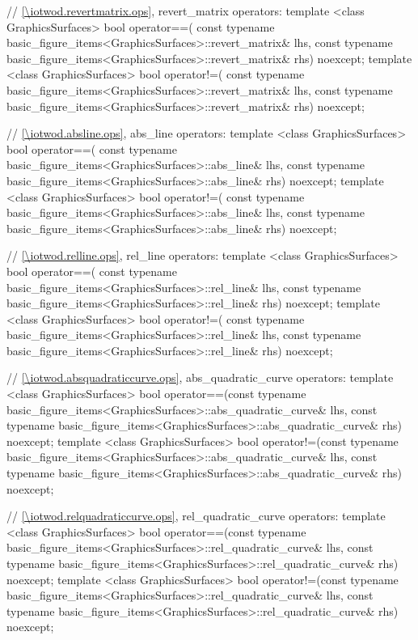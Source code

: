 \begin{codeblock}
{  // \ref{\iotwod.revertmatrix.ops}, revert_matrix operators:
  template <class GraphicsSurfaces>
  bool operator==(
    const typename basic_figure_items<GraphicsSurfaces>::revert_matrix& lhs,
    const typename basic_figure_items<GraphicsSurfaces>::revert_matrix& rhs) 
    noexcept;
  template <class GraphicsSurfaces>
  bool operator!=(
    const typename basic_figure_items<GraphicsSurfaces>::revert_matrix& lhs,
    const typename basic_figure_items<GraphicsSurfaces>::revert_matrix& rhs) 
    noexcept;

  // \ref{\iotwod.absline.ops}, abs_line operators:
  template <class GraphicsSurfaces>
  bool operator==(
    const typename basic_figure_items<GraphicsSurfaces>::abs_line& lhs,
    const typename basic_figure_items<GraphicsSurfaces>::abs_line& rhs) 
    noexcept;
  template <class GraphicsSurfaces>
  bool operator!=(
    const typename basic_figure_items<GraphicsSurfaces>::abs_line& lhs,
    const typename basic_figure_items<GraphicsSurfaces>::abs_line& rhs) 
    noexcept;

  // \ref{\iotwod.relline.ops}, rel_line operators:
  template <class GraphicsSurfaces>
  bool operator==(
    const typename basic_figure_items<GraphicsSurfaces>::rel_line& lhs,
    const typename basic_figure_items<GraphicsSurfaces>::rel_line& rhs) 
    noexcept;
  template <class GraphicsSurfaces>
  bool operator!=(
    const typename basic_figure_items<GraphicsSurfaces>::rel_line& lhs,
    const typename basic_figure_items<GraphicsSurfaces>::rel_line& rhs) 
    noexcept;

  // \ref{\iotwod.absquadraticcurve.ops}, abs_quadratic_curve operators:
  template <class GraphicsSurfaces>
  bool operator==(const typename
    basic_figure_items<GraphicsSurfaces>::abs_quadratic_curve& lhs,
    const typename basic_figure_items<GraphicsSurfaces>::abs_quadratic_curve& 
    rhs) noexcept;
  template <class GraphicsSurfaces>
  bool operator!=(const typename 
    basic_figure_items<GraphicsSurfaces>::abs_quadratic_curve& lhs,
    const typename basic_figure_items<GraphicsSurfaces>::abs_quadratic_curve& 
    rhs) noexcept;

  // \ref{\iotwod.relquadraticcurve.ops}, rel_quadratic_curve operators:
  template <class GraphicsSurfaces>
  bool operator==(const typename 
    basic_figure_items<GraphicsSurfaces>::rel_quadratic_curve& lhs,
    const typename basic_figure_items<GraphicsSurfaces>::rel_quadratic_curve& 
    rhs) noexcept;
  template <class GraphicsSurfaces>
  bool operator!=(const typename 
    basic_figure_items<GraphicsSurfaces>::rel_quadratic_curve& lhs,
    const typename basic_figure_items<GraphicsSurfaces>::rel_quadratic_curve& 
    rhs) noexcept;

}
\end{codeblock}
